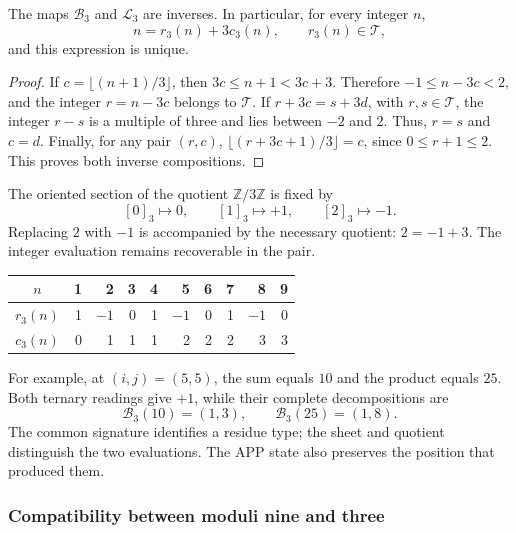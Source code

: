 \begin{proposicion}
\label{trit:prop:restitucion}
The maps \(\mathcal B_3\) and \(\mathcal L_3\) are inverses.
In particular, for every integer \(n\),
\[
 n=r_3(n)+3c_3(n),\qquad r_3(n)\in\mathcal T,
\]
and this expression is unique.
\end{proposicion}
\begin{proof}
If \(c=\lfloor(n+1)/3\rfloor\), then
\(3c\le n+1<3c+3\). Therefore \(-1\le n-3c<2\), and the integer
\(r=n-3c\) belongs to \(\mathcal T\). If
\(r+3c=s+3d\), with \(r,s\in\mathcal T\), the integer \(r-s\) is a multiple
of three and lies between \(-2\) and \(2\). Thus, \(r=s\) and \(c=d\).
Finally, for any pair \((r,c)\),
\(\lfloor(r+3c+1)/3\rfloor=c\), since \(0\le r+1\le2\).
This proves both inverse compositions.
\end{proof}

The oriented section of the quotient \(\mathbb Z/3\mathbb Z\) is fixed by
\[
 [0]_3\longmapsto0,\qquad [1]_3\longmapsto+1,
 \qquad [2]_3\longmapsto-1.
\]
Replacing \(2\) with \(-1\) is accompanied by the necessary quotient:
\(2=-1+3\). The integer evaluation remains recoverable in the pair.

\begin{tablacompleta}
\caption{Balanced decomposition of the nine positions on an APP line.}
\label{trit:tabla:nueve}
\begin{tabular}{c*{9}{r}}
\toprule
\(n\)&1&2&3&4&5&6&7&8&9\\
\midrule
\(r_3(n)\)&1&$-1$&0&1&$-1$&0&1&$-1$&0\\
\(c_3(n)\)&0&1&1&1&2&2&2&3&3\\
\bottomrule
\end{tabular}
\end{tablacompleta}

For example, at \((i,j)=(5,5)\), the sum equals \(10\) and the product equals
\(25\). Both ternary readings give \(+1\), while their
complete decompositions are
\[
 \mathcal B_3(10)=(1,3),\qquad
 \mathcal B_3(25)=(1,8).
\]
The common signature identifies a residue type; the sheet and quotient distinguish
the two evaluations. The APP state also preserves the position that
produced them.

\subsubsection{Compatibility between moduli nine and three}

